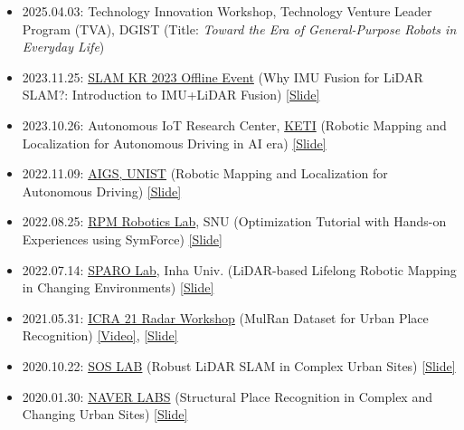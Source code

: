 \begin{itemize}[label=$\cdot$]
    \item 2025.04.03: Technology Innovation Workshop, Technology Venture Leader Program (TVA), DGIST  
    \hfill (Title: \textit{Toward the Era of General-Purpose Robots in Everyday Life})

    \item 2023.11.25: \href{https://drive.google.com/file/d/1h5sMgkyGGA8X2gxJUEzWCSwX9RlujNpe/view?usp=sharing}{SLAM KR 2023 Offline Event} (Why IMU Fusion for LiDAR SLAM?: Introduction to IMU+LiDAR Fusion) \href{https://bit.ly/20231125_slamkr_giseopkim}{[Slide]}
    
    \item 2023.10.26: Autonomous IoT Research Center, \href{https://www.keti.re.kr/eng/main/main.php}{KETI} (Robotic Mapping and Localization for Autonomous Driving in AI era) \href{https://bit.ly/408J7XJ}{[Slide]}
    
    \item 2022.11.09: \href{https://ib.unist.ac.kr/robust-slam-simultaneous-localization-and-mapping-for-large-scale-urban-mapping-and-autonomous-driving/}{AIGS, UNIST} (Robotic Mapping and Localization for Autonomous Driving) \href{https://docs.google.com/presentation/d/1RLrrxGzzGWEgUQMvdWH0wNfsyn6ML2Hjw88PmgdrvlQ/edit?usp=sharing}{[Slide]}
    
    \item 2022.08.25: \href{https://rpm.snu.ac.kr/}{RPM Robotics Lab}, SNU (Optimization Tutorial with Hands-on Experiences using SymForce) \href{https://docs.google.com/presentation/d/1Z1FjnphgP60jTIa6da8vwhaAEzULefLrPQsJ4yBHAJA/edit?usp=sharing}{[Slide]}
    
    \item 2022.07.14: \href{https://sites.google.com/view/sparo/홈}{SPARO Lab}, Inha Univ. (LiDAR-based Lifelong Robotic Mapping in Changing Environments) \href{https://docs.google.com/presentation/d/1Muld60rT7KY_FaN4hyRaPHR2FsPkLV8z7fz7rYQzIv4/edit?usp=sharing}{[Slide]}
    
    \item 2021.05.31: \href{https://sites.google.com/view/radar-robotics/home}{ICRA 21 Radar Workshop} (MulRan Dataset for Urban Place Recognition) \href{https://www.youtube.com/watch?v=jFvKW9Kj8Ts}{[Video]}, \href{https://www.dropbox.com/s/dknylah6b7rizr8/20210531\%20icra\%20ws\%20mulran\%20v3.pptx?dl=0}{[Slide]}
    
    \item 2020.10.22: \href{http://soslab.co/}{SOS LAB} (Robust LiDAR SLAM in Complex Urban Sites) \href{https://www.dropbox.com/s/p30dpjqjbjhq69x/20201022\%20SOSLAB\%20talk\%20Giseop\%20Kim\%20share.pdf?dl=0}{[Slide]}
    
    \item 2020.01.30: \href{https://www.naverlabs.com/}{NAVER LABS} (Structural Place Recognition in Complex and Changing Urban Sites) \href{https://www.google.com/url?q=https\%3A\%2F\%2Fwww.dropbox.com\%2Fs\%2Fcoul2elzlulbj1j\%2FStructural\%2520Place\%2520Recognition\%2520in\%2520Complex\%2520and\%2520Changing\%2520Urban\%2520Sites.pptx\%3Fdl\%3D0&sa=D&sntz=1&usg=AFQjCNF6McgylrY6kU5KmqvCLC6_n-TzIw}{[Slide]}
\end{itemize}

